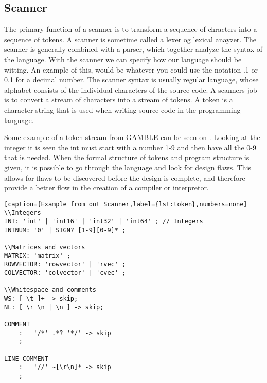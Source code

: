 \subsection{Scanner}
The primary function of a scanner is to transform a sequence of chracters into a sequence of tokens.
A scanner is sometime called a lexer og lexical anayzer.
The scanner is generally combined with a parser, which together analyze the syntax of the language.
With the scanner we can specify how our language should be witting. 
An example of this, would be whatever you could use the notation .1 or 0.1 for a decimal number.
The scanner syntax is usually regular language, whose alphabet consists of the individual characters of the source code.
A scanners job is to convert a stream of characters into a stream of tokens.
A token is a character string that is used when writing source code in the programming language.

Some example of a token stream from GAMBLE can be seen on \myref{}.
Looking at the integer it is seen  the int must start with a number 1-9 and then have all the 0-9 that is needed.
When the formal structure of tokens and program structure is given, it is possible to go through the language and look for design flaws.
This allows for flaws to be discovered before the design is complete, and therefore provide a better flow in the creation of a compiler or interpretor. \citep{Crafting}

\begin{lstlisting}[caption={Example from out Scanner,label={lst:token},numbers=none]
\\Integers
INT: 'int' | 'int16' | 'int32' | 'int64' ; // Integers
INTNUM: '0' | SIGN? [1-9][0-9]* ;

\\Matrices and vectors
MATRIX: 'matrix' ;
ROWVECTOR: 'rowvector' | 'rvec' ;
COLVECTOR: 'colvector' | 'cvec' ;  

\\Whitespace and comments
WS: [ \t ]+ -> skip;
NL: [ \r \n | \n ] -> skip;

COMMENT
    :   '/*' .*? '*/' -> skip
    ;

LINE_COMMENT
    :   '//' ~[\r\n]* -> skip
    ;
\end{lstlisting}